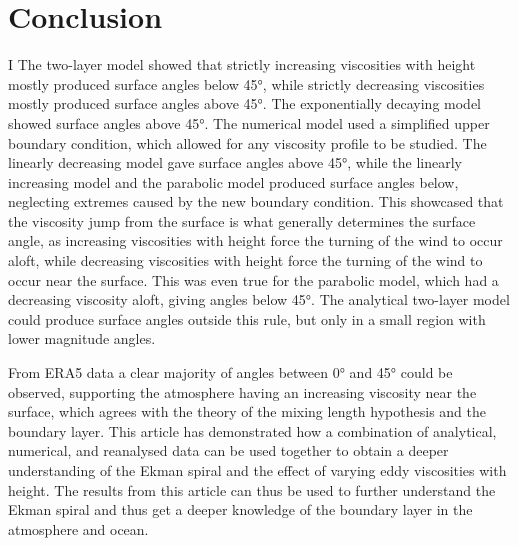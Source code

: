 \section{Conclusion}
I%
The two-layer model showed that strictly increasing viscosities with height mostly produced surface angles below \ang{45}, while strictly decreasing viscosities mostly produced surface angles above \ang{45}. The exponentially decaying model showed surface angles above \ang{45}. The numerical model used a simplified upper boundary condition, which allowed for any viscosity profile to be studied. The linearly decreasing model gave surface angles above \ang{45}, while the linearly increasing model and the parabolic model produced surface angles below, neglecting extremes caused by the new boundary condition. This showcased that the viscosity jump from the surface is what generally determines the surface angle, as increasing viscosities with height force the turning of the wind to occur aloft, while decreasing viscosities with height force the turning of the wind to occur near the surface. This was even true for the parabolic model, which had a decreasing viscosity aloft, giving angles below \ang{45}. The analytical two-layer model could produce surface angles outside this rule, but only in a small region with lower magnitude angles. 

From ERA5 data a clear majority of angles between \ang{0} and \ang{45} could be observed, supporting the atmosphere having an increasing viscosity near the surface, which agrees with the theory of the mixing length hypothesis and the boundary layer. This article has demonstrated how a combination of analytical, numerical, and reanalysed data can be used together to obtain a deeper understanding of the Ekman spiral and the effect of varying eddy viscosities with height. The results from this article can thus be used to further understand the Ekman spiral and thus get a deeper knowledge of the boundary layer in the atmosphere and ocean.